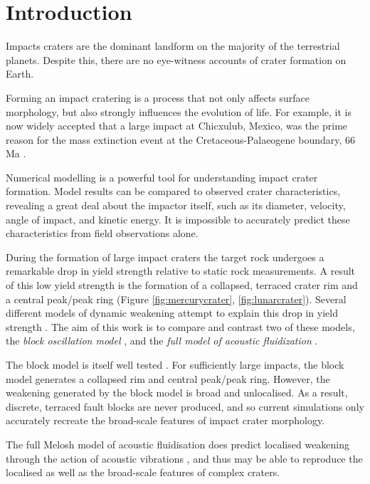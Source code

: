 \newpage
\section{Introduction}


Impacts craters are the dominant landform on the majority of the terrestrial planets. Despite this, there are no eye-witness accounts of crater formation on Earth. 

Forming an impact cratering is a process that not only affects surface morphology, but also strongly influences the evolution of life. For example, it is now widely accepted that a large impact at Chicxulub, Mexico, was the prime reason for the mass extinction event at the Cretaceous-Palaeogene boundary, 66 Ma \citep{schulte2010chicxulub}.

Numerical modelling is a powerful tool for understanding impact crater formation. Model results can be compared to observed crater characteristics, revealing a great deal about the impactor itself, such as its diameter, velocity, angle of impact, and kinetic energy. It is impossible to accurately predict these characteristics from field observations alone. 

During the formation of large impact craters the target rock undergoes a remarkable drop in yield strength relative to static rock measurements. A result of this low yield strength is the formation of a collapsed, terraced crater rim and a central peak/peak ring (Figure \ref{fig:mercurycrater}, \ref{fig:lunarcrater}). Several different models of dynamic weakening attempt to explain this drop in yield strength \citep{kenkmann2012modification}. The aim of this work is to compare and contrast two of these models, the \textit{block oscillation model} \citep{ivanov1997block}, and the \textit{full model of acoustic fluidization} \citep{melosh1979acoustic}.

The block model is itself well tested \citetext{\citet{collins2002hydrocode} and \citet{morgan2000peak}, for example}. For sufficiently large impacts, the block model generates a collapsed rim and central peak/peak ring. However, the weakening generated by the block model is broad and unlocalised. As a result, discrete, terraced fault blocks are never produced, and so current simulations only accurately recreate the broad-scale features of impact crater morphology. 

The full Melosh model of acoustic fluidisation does predict localised weakening through the action of acoustic vibrations \citep{melosh1979acoustic}, and thus may be able to reproduce the localised as well as the broad-scale features of complex craters.

